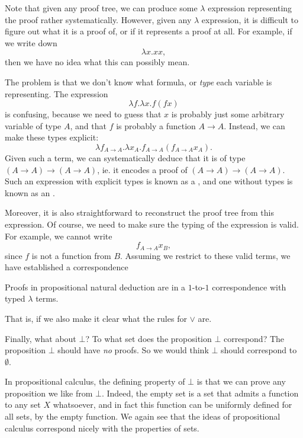\documentclass[a4paper]{article}
\begin{document}
Note that given any proof tree, we can produce some $\lambda$ expression representing the proof rather systematically. However, given any $\lambda$ expression, it is difficult to figure out what it is a proof of, or if it represents a proof at all. For example, if we write down
\[
  \lambda x. xx,
\]
then we have no idea what this can possibly mean.

The problem is that we don't know what formula, or \emph{type} each variable is representing. The expression
\[
  \lambda f. \lambda x. f (f x)
\]
is confusing, because we need to guess that $x$ is probably just some arbitrary variable of type $A$, and that $f$ is probably a function $A \to A$. Instead, we can make these types explicit:
\[
  \lambda f_{A \to A}. \lambda x_A. f_{A \to A} (f_{A \to A} x_A).
\]
Given such a term, we can systematically deduce that it is of type $(A \to A) \to (A \to A)$, ie. it encodes a proof of $(A \to A) \to (A \to A)$. Such an expression with explicit types is known as a , and one without types is known as an .

Moreover, it is also straightforward to reconstruct the proof tree from this expression. Of course, we need to make sure the typing of the expression is valid. For example, we cannot write
\[
  f_{A \to A} x_B,
\]
since $f$ is not a function from $B$. Assuming we restrict to these valid terms, we have established a correspondence
\begin{significant}
  Proofs in propositional natural deduction are in a $1$-to-$1$ correspondence with typed $\lambda$ terms.
\end{significant}
That is, if we also make it clear what the rules for $\vee$ are.

Finally, what about $\bot$? To what set does the proposition $\bot$ correspond? The proposition $\bot$ should have \emph{no} proofs. So we would think $\bot$ should correspond to $\emptyset$.

In propositional calculus, the defining property of $\bot$ is that we can prove any proposition we like from $\bot$. Indeed, the empty set is a set that admits a function to any set $X$ whatsoever, and in fact this function can be uniformly defined for all sets, by the empty function. We again see that the ideas of propositional calculus correspond nicely with the properties of sets.
\end{document}
